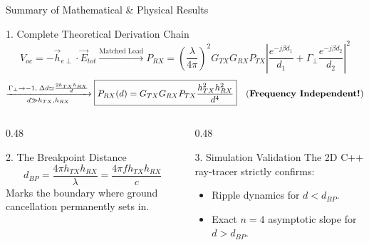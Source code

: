 \documentclass[aspectratio=169, 10pt]{beamer}
\begin{document}
\begin{frame}{Summary of Mathematical \& Physical Results}
    \begin{block}{1. Complete Theoretical Derivation Chain}
        \begin{equation*}
            V_{oc} = -\vec{h}_{e\perp}\cdot\vec{E}_{tot} \xrightarrow{\text{Matched Load}} P_{RX} = \left(\frac{\lambda}{4\pi}\right)^2 G_{TX} G_{RX} P_{TX} \left| \frac{e^{-j\beta d_1}}{d_1} + \Gamma_\perp \frac{e^{-j\beta d_2}}{d_2} \right|^2
        \end{equation*}
        \begin{equation*}
            \xrightarrow[d \gg h_{TX}, h_{RX}]{\Gamma_\perp \to -1, \; \Delta d \simeq \frac{2 h_{TX} h_{RX}}{d}} \boxed{P_{RX}(d) = G_{TX} G_{RX} P_{TX} \frac{h_{TX}^2 h_{RX}^2}{d^4}} \quad \text{(\textbf{Frequency Independent!})}
        \end{equation*}
    \end{block}

    \begin{columns}[T]
        \begin{column}{0.48\textwidth}
            \begin{block}{2. The Breakpoint Distance}
                $$\boxed{d_{BP} = \frac{4\pi h_{TX} h_{RX}}{\lambda} = \frac{4\pi f h_{TX} h_{RX}}{c}}$$
                Marks the boundary where ground cancellation permanently sets in.
            \end{block}
        \end{column}
        
        \begin{column}{0.48\textwidth}
            \begin{block}{3. Simulation Validation}
                The 2D C++ ray-tracer strictly confirms:
                \begin{itemize}
                    \item Ripple dynamics for $d < d_{BP}$.
                    \item Exact $n=4$ asymptotic slope for $d > d_{BP}$.
                \end{itemize}
            \end{block}
        \end{column}
    \end{columns}
\end{frame}
\end{document}
